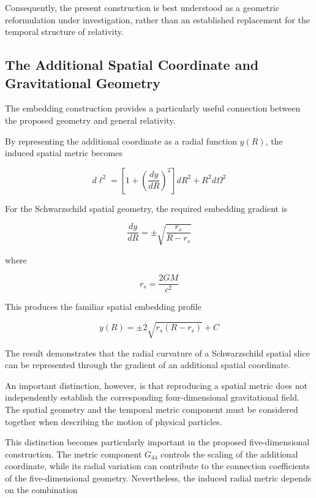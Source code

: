 \documentclass[pdflatex,sn-mathphys-num]{sn-jnl}%
\theoremstyle{thmstyleone}%
\theoremstyle{thmstyletwo}%
\theoremstyle{thmstylethree}%
\begin{document}
Consequently, the present construction is best understood as a geometric reformulation under investigation, rather than an established replacement for the temporal structure of relativity.

\subsection{The Additional Spatial Coordinate and Gravitational Geometry}

The embedding construction provides a particularly useful connection between the proposed geometry and general relativity.

By representing the additional coordinate as a radial function $y(R)$, the induced spatial metric becomes

\begin{equation}
    d\ell^2
    =
    \left[
        1+\left(\frac{dy}{dR}\right)^2
    \right]dR^2
    +
    R^2d\Omega^2
\end{equation}

For the Schwarzschild spatial geometry, the required embedding gradient is

\begin{equation}
    \frac{dy}{dR}
    =
    \pm
    \sqrt{
        \frac{r_s}{R-r_s}
    }
\end{equation}

where

\begin{equation}
    r_s=\frac{2GM}{c^2}
\end{equation}

This produces the familiar spatial embedding profile

\begin{equation}
    y(R)
    =
    \pm 2\sqrt{r_s(R-r_s)}+C
\end{equation}

The result demonstrates that the radial curvature of a Schwarzschild spatial slice can be represented through the gradient of an additional spatial coordinate.

An important distinction, however, is that reproducing a spatial metric does not independently establish the corresponding four-dimensional gravitational field. The spatial geometry and the temporal metric component must be considered together when describing the motion of physical particles.

This distinction becomes particularly important in the proposed five-dimensional construction. The metric component $G_{44}$ controls the scaling of the additional coordinate, while its radial variation can contribute to the connection coefficients of the five-dimensional geometry. Nevertheless, the induced radial metric depends on the combination
\end{document}
